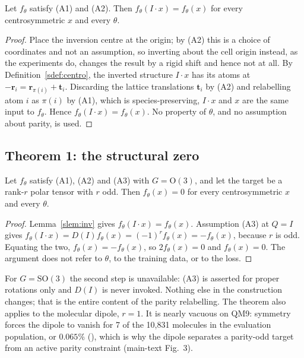 \begin{lemma}\label{slem:inv}
Let $f_\theta$ satisfy (A1) and (A2). Then $f_\theta(I\!\cdot\!x) = f_\theta(x)$ for every centrosymmetric $x$ and every $\theta$.
\end{lemma}

\begin{proof}
Place the inversion centre at the origin; by (A2) this is a choice of coordinates and not an assumption, so inverting about the cell origin instead, as the experiments do, changes the result by a rigid shift and hence not at all. By Definition~\ref{sdef:centro}, the inverted structure $I\!\cdot\!x$ has its atoms at $-\mathbf{r}_i = \mathbf{r}_{\pi(i)} + \mathbf{t}_i$. Discarding the lattice translations $\mathbf{t}_i$ by (A2) and relabelling atom $i$ as $\pi(i)$ by (A1), which is species-preserving, $I\!\cdot\!x$ and $x$ are the same input to $f_\theta$. Hence $f_\theta(I\!\cdot\!x) = f_\theta(x)$. No property of $\theta$, and no assumption about parity, is used.
\end{proof}

\subsection*{Theorem 1: the structural zero}

\begin{theorem}\label{sthm:zero}
Let $f_\theta$ satisfy (A1), (A2) and (A3) with $G=\mathrm{O}(3)$, and let the target be a rank-$r$ polar tensor with $r$ odd. Then $f_\theta(x)=0$ for every centrosymmetric $x$ and every $\theta$.
\end{theorem}

\begin{proof}
Lemma~\ref{slem:inv} gives $f_\theta(I\!\cdot\!x) = f_\theta(x)$. Assumption (A3) at $Q = I$ gives
$f_\theta(I\!\cdot\!x) = D(I) f_\theta(x) = (-1)^{r} f_\theta(x) = -f_\theta(x)$, because $r$ is odd.
Equating the two, $f_\theta(x) = -f_\theta(x)$, so $2 f_\theta(x) = 0$ and $f_\theta(x) = 0$. The argument does not refer to $\theta$, to the training data, or to the loss.
\end{proof}

For $G=\mathrm{SO}(3)$ the second step is unavailable: (A3) is asserted for proper rotations only and $D(I)$ is never invoked. Nothing else in the construction changes; that is the entire content of the parity relabelling. The theorem also applies to the molecular dipole, $r=1$. It is nearly vacuous on QM9: symmetry forces the dipole to vanish for 7 of the 10,831 molecules in the evaluation population, or $0.065\%$ (), which is why the dipole separates a parity-odd target from an active parity constraint (main-text Fig.~3).


